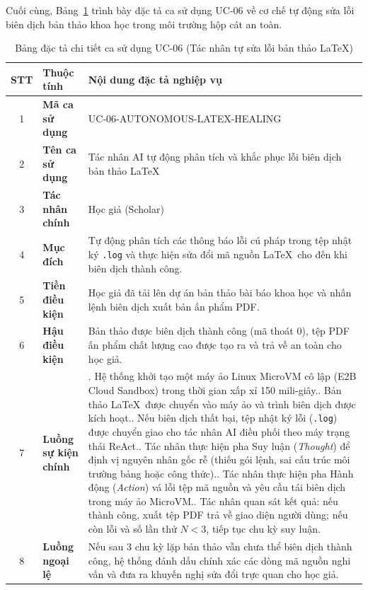 Cuối cùng, Bảng~\ref{tab:uc_06_spec} trình bày đặc tả ca sử dụng UC-06 về cơ chế tự động sửa lỗi biên dịch bản thảo khoa học trong môi trường hộp cát an toàn.

\begin{table}[htbp]
\centering
\singlespacing
\footnotesize
\renewcommand{\arraystretch}{1.12}
\caption{Bảng đặc tả chi tiết ca sử dụng UC-06 (Tác nhân tự sửa lỗi bản thảo \LaTeX)}
\label{tab:uc_06_spec}
\setlength{\tabcolsep}{4pt}
\begin{tabular}{|c|>{\raggedright\arraybackslash}p{2.6cm}|>{\raggedright\arraybackslash}p{10.2cm}|}
\hline
\textbf{STT} & \centering\textbf{Thuộc tính} & \centering\textbf{Nội dung đặc tả nghiệp vụ} \tabularnewline \hline
1 & \textbf{Mã ca sử dụng} & UC-06-AUTONOMOUS-LATEX-HEALING \\ \hline
2 & \textbf{Tên ca sử dụng} & Tác nhân AI tự động phân tích và khắc phục lỗi biên dịch bản thảo \LaTeX \\ \hline
3 & \textbf{Tác nhân chính} & Học giả (Scholar) \\ \hline
4 & \textbf{Mục đích} & Tự động phân tích các thông báo lỗi cú pháp trong tệp nhật ký \texttt{.log} và thực hiện sửa đổi mã nguồn \LaTeX\ cho đến khi biên dịch thành công. \\ \hline
5 & \textbf{Tiền điều kiện} & Học giả đã tải lên dự án bản thảo bài báo khoa học và nhấn lệnh biên dịch xuất bản ấn phẩm PDF. \\ \hline
6 & \textbf{Hậu điều kiện} & Bản thảo được biên dịch thành công (mã thoát 0), tệp PDF ấn phẩm chất lượng cao được tạo ra và trả về an toàn cho học giả. \\ \hline
7 & \textbf{Luồng sự kiện chính} & 
1. Hệ thống khởi tạo một máy ảo Linux MicroVM cô lập (E2B Cloud Sandbox) trong thời gian xấp xỉ 150 mili-giây.\newline
2. Bản thảo \LaTeX\ được chuyển vào máy ảo và trình biên dịch được kích hoạt.\newline
3. Nếu biên dịch thất bại, tệp nhật ký lỗi (\texttt{.log}) được chuyển giao cho tác nhân AI điều phối theo máy trạng thái ReAct.\newline
4. Tác nhân thực hiện pha Suy luận (\textit{Thought}) để định vị nguyên nhân gốc rễ (thiếu gói lệnh, sai cấu trúc môi trường bảng hoặc công thức).\newline
5. Tác nhân thực hiện pha Hành động (\textit{Action}) vá lỗi tệp mã nguồn và yêu cầu tái biên dịch trong máy ảo MicroVM.\newline
6. Tác nhân quan sát kết quả: nếu thành công, xuất tệp PDF trả về giao diện người dùng; nếu còn lỗi và số lần thử $N < 3$, tiếp tục chu kỳ suy luận. \\ \hline
8 & \textbf{Luồng ngoại lệ} & Nếu sau 3 chu kỳ lặp bản thảo vẫn chưa thể biên dịch thành công, hệ thống đánh dấu chính xác các dòng mã nguồn nghi vấn và đưa ra khuyến nghị sửa đổi trực quan cho học giả. \\ \hline
\end{tabular}
\end{table}
